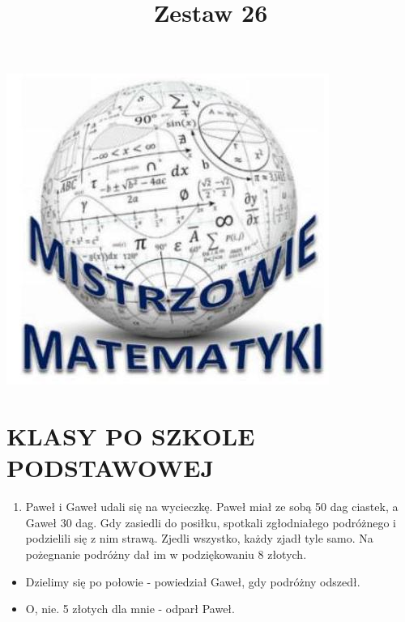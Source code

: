 \documentclass[10pt]{article}
\title{Zestaw 26 }
\author{}
\date{}
\begin{document}
\maketitle
\begin{center}
\includegraphics[max width=\textwidth]{2024_11_21_857059a7afb998274c95g-1}
\end{center}

\section*{KLASY PO SZKOLE PODSTAWOWEJ}
\begin{enumerate}
  \item Paweł i Gaweł udali się na wycieczkę. Paweł miał ze sobą 50 dag ciastek, a Gaweł 30 dag. Gdy zasiedli do posiłku, spotkali zgłodniałego podróżnego i podzielili się z nim strawą. Zjedli wszystko, każdy zjadł tyle samo. Na pożegnanie podróżny dał im w podziękowaniu 8 złotych.
\end{enumerate}

\begin{itemize}
  \item Dzielimy się po połowie - powiedział Gaweł, gdy podróżny odszedł.
  \item O, nie. 5 złotych dla mnie - odparł Paweł.
\end{itemize}
\end{document}
